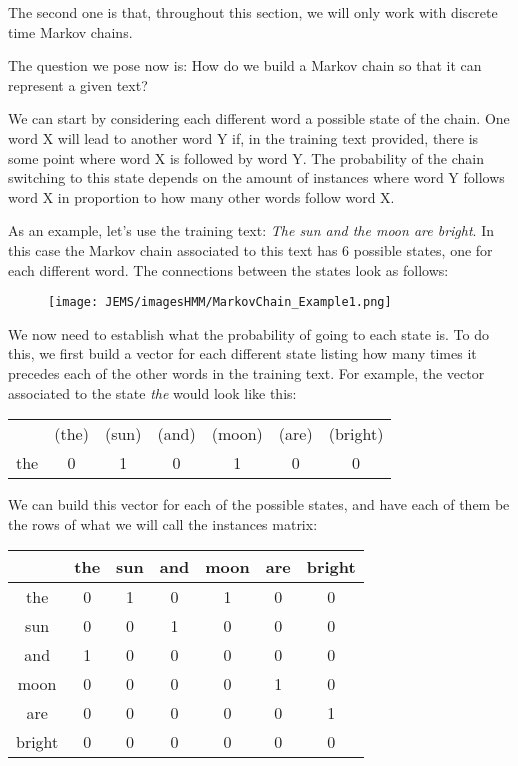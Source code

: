 \documentclass[12pt]{article}
\numberwithin{equation}{section}
\begin{document}
The second one is that, throughout this section, we will only work with discrete time Markov chains.

\bigskip

The question we pose now is: How do we build a Markov chain so that it can represent a given text?

We can start by considering each different word a possible state of the chain. One word X will lead to another word Y if, in the training text provided, there is some point where word X is followed by word Y. The probability of the chain switching to this state depends on the amount of instances where word Y follows word X in proportion to how many other words follow word X.

As an example, let's use the training text: \textit{The sun and the moon are bright}. In this case the Markov chain associated to this text has 6 possible states, one for each different word. The connections between the states look as follows:

\begin{figure}[H]
\begin{center}
    \texttt{[image: JEMS/imagesHMM/MarkovChain\_Example1.png]}
\end{center}
\end{figure}

We now need to establish what the probability of going to each state is. To do this, we first build a vector for each different state listing how many times it precedes each of the other words in the training text. For example, the vector associated to the state \textit{the} would look like this:

\begin{center}
\begin{tabular}{|c|cccccc|}
\hline
  & (the) & (sun) & (and) & (moon) & (are) & (bright) \\
 the & 0 & 1 & 0 & 1 & 0 & 0 \\
 \hline
\end{tabular}
\end{center}

We can build this vector for each of the possible states, and have each of them be the rows of what we will call the instances matrix:

\begin{center}
\begin{tabular}{|c|cccccc|}
\hline
 & the & sun & and & moon & are & bright \\
\hline
the & 0 & 1 & 0 & 1 & 0 & 0 \\
sun & 0 & 0 & 1 & 0 & 0 & 0 \\
and & 1 & 0 & 0 & 0 & 0 & 0 \\
moon & 0 & 0 & 0 & 0 & 1 & 0 \\
are & 0 & 0 & 0 & 0 & 0 & 1 \\
bright & 0 & 0 & 0 & 0 & 0 & 0 \\
\hline
\end{tabular}
\end{center}
\end{document}
